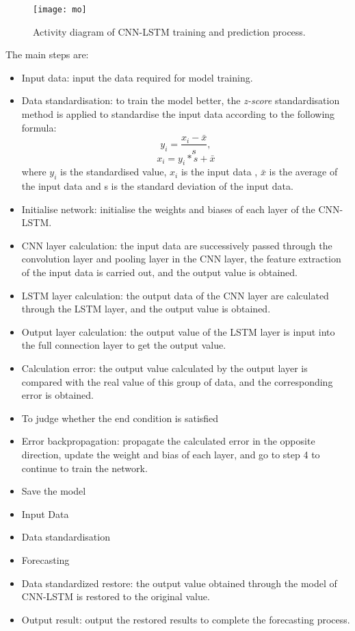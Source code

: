 \documentclass[12pt]{article}
\begin{document}
\begin{figure}[h]
\centering
\texttt{[image: mo]}
\caption{Activity diagram of CNN-LSTM training and prediction process.}
\label{fig:3}
\end{figure}
The main steps are:
\begin{itemize}
\item Input data: input the data required for model training.
\item Data standardisation: to train the model better, the \textit{z-score} standardisation method is applied to standardise the input data according to the following formula: $$y_i=\frac{x_i-\bar{x}}{s},$$
$$x_i = y_i*s+\bar{x}$$
where $y_i$ is the standardised value, $x_i$ is the input data , $\bar{x}$ is the average of the input data and s is the standard deviation of the input data.
\item Initialise network: initialise the weights and biases of each layer of the CNN-LSTM.
\item CNN layer calculation: the input data are successively passed through the convolution layer and pooling layer in the CNN layer, the feature extraction of the input data is carried out, and the output value is obtained.
\item	LSTM layer calculation: the output data of the CNN layer are calculated through the LSTM layer, and the output value is obtained.
\item Output layer calculation: the output value of the LSTM layer is input into the full connection layer to get the output value.
\item Calculation error: the output value calculated by the output layer is compared with the real value of this group of data, and the corresponding error is obtained.
\item To judge whether the end condition is satisfied
\item 	Error backpropagation: propagate the calculated error in the opposite direction, update the weight and bias of each layer, and go to step 4 to continue to train the network.
\item Save the model
\item Input Data
\item Data standardisation
\item Forecasting
\item Data standardized restore: the output value obtained through the model of CNN-LSTM is restored to the original value.
\item Output result: output the restored results to complete the forecasting process.
\end{itemize}
\end{document}
